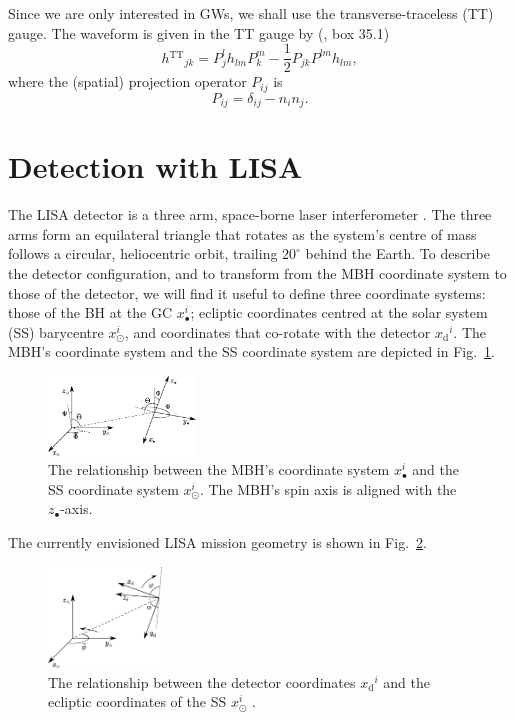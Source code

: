 \documentclass[useAMS,usedcolumn,usegraphicx,usenatbib]{mn2e}
\newcommand{\figref}[1]{Fig.~\ref{fig:#1}}
\newcommand{\sub}[1]{\ensuremath{_\mathrm{#1}}}
\newcommand{\super}[1]{\ensuremath{^\mathrm{#1}}}
\newcommand{\recip}[1]{\ensuremath{\frac{1}{#1}}}
\begin{document}
Since we are only interested in GWs, we shall use the transverse-traceless (TT) gauge. The waveform is given in the TT gauge by (\citealt{Misner1973}, box 35.1)
\begin{equation}
h\super{TT}_{jk} = P^l_jh_{lm}P^m_k - \recip{2}P_{jk}P^{lm}h_{lm},
\end{equation}
where the (spatial) projection operator $P_{ij}$ is
\begin{equation}
P_{ij} = \delta_{ij} - n_in_j.
\end{equation}

\section{Detection with LISA}\label{sec:Detector}

The LISA detector is a three arm, space-borne laser interferometer \citep{Bender1998, Danzmann2003}. The three arms form an equilateral triangle that rotates as the system's centre of mass follows a circular, heliocentric orbit, trailing $20^{\circ}$ behind the Earth. To describe the detector configuration, and to transform from the MBH coordinate system to those of the detector, we will find it useful to define three coordinate systems: those of the BH at the GC $x_\bullet^i$; ecliptic coordinates centred at the solar system (SS) barycentre $x_\odot^i$, and coordinates that co-rotate with the detector $x\sub{d}^i$. The MBH's coordinate system and the SS coordinate system are depicted in \figref{BH_SS}.
\begin{figure}
\begin{center}
 \includegraphics[width=0.35\textwidth]{BH_SS.eps}
    \caption{The relationship between the MBH's coordinate system $x_\bullet^i$ and the SS coordinate system $x_\odot^i$. The MBH's spin axis is aligned with the $z_\bullet$-axis.}
   \label{fig:BH_SS}
\end{center}
\end{figure}
The currently envisioned LISA mission geometry is shown in \figref{SS_LISA}.
\begin{figure}
\begin{center}
 \includegraphics[width=0.27\textwidth]{SS_LISA.eps}
    \caption{The relationship between the detector coordinates $x\sub{d}^i$ and the ecliptic coordinates of the SS $x_\odot^i$ \citep{Bender1998}.}
   \label{fig:SS_LISA}
\end{center}
\end{figure}
\end{document}
